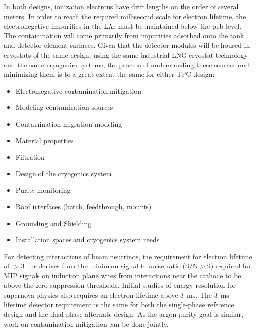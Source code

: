 In both designs, ionization electrons have drift lengths on the order
of several meters. In order to reach the required millisecond scale for
electron lifetime, the electronegative impurities in the LAr must be
maintained below the ppb level. The contamination will
come primarily from impurities adsorbed onto the tank and detector element surfaces.
Given that the detector modules will be housed in cryostats of the same design,
using the same industrial LNG cryostat technology and the same cryogenics systems,
the process of understanding these sources and minimizing them
is to a great extent the same for either TPC design:
\begin{itemize}
\item Electronegative contamination mitigation	
\item Modeling contamination sources
\item Contamination migration modeling
\item Material properties
\item Filtration	
\item Design of the cryogenics system
\item Purity monitoring	
\item Roof interfaces (hatch, feedthrough, mounts)	
\item Grounding and Shielding
\item Installation spaces and cryogenics system needs	
\end{itemize}



For detecting interactions of beam neutrinos, the requirement for
electron lifetime of $>$3~ms derives from the minimum signal to noise
ratio (S/N$>$9) required for MIP signals on induction plane wires from
interactions near the cathode to be above the zero suppression
thresholds.  Initial studies of energy resolution for supernova physics
also requires an electron lifetime above 3~ms.  The 3~ms lifetime
detector requirement is the same for both the single-phase reference
design and the dual-phase alternate design.  As the argon purity goal
is similar, work on contamination mitigation can be done jointly.

